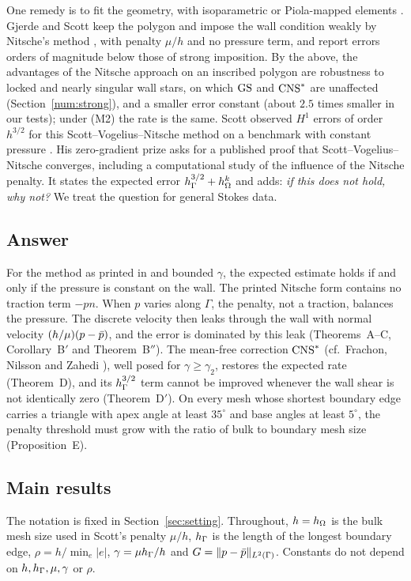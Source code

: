 One remedy is to fit the geometry, with isoparametric or Piola-mapped elements \cite{NeilanOtus2021,DurstNeilan2024}. Gjerde and Scott \cite{GjerdeScott2024} keep the polygon and impose the wall condition weakly by Nitsche's method \cite{Nitsche1971}, with penalty $\mu/h$ and no pressure term, and report errors orders of magnitude below those of strong imposition. By the above, the advantages of the Nitsche approach on an inscribed polygon are robustness to locked and nearly singular wall stars, on which $\mathrm{GS}$ and $\mathrm{CNS}^\ast$ are unaffected (Section~\ref{num:strong}), and a smaller error constant (about $2.5$ times smaller in our tests); under (M2) the rate is the same. Scott observed $H^1$ errors of order $h^{3/2}$ for this Scott--Vogelius--Nitsche method on a benchmark with constant pressure \cite{ScottPrize}. His zero-gradient prize \cite{ScottPrize} asks for a published proof that Scott--Vogelius--Nitsche converges, including a computational study of the influence of the Nitsche penalty. It states the expected error $h_\Gamma^{3/2}+h_\Omega^k$ and adds: \emph{if this does not hold, why not?} We treat the question for general Stokes data.

\subsection*{Answer}
For the method as printed in \cite[(27)--(28)]{GjerdeScott2024} and bounded $\gamma$, the expected estimate holds if and only if the pressure is constant on the wall. The printed Nitsche form contains no traction term $-pn$. When $p$ varies along $\Gamma$, the penalty, not a traction, balances the pressure. The discrete velocity then leaks through the wall with normal velocity $(h/\mu)(p-\bar p)$, and the error is dominated by this leak (Theorems~A--C, Corollary~B$'$ and Theorem~B$''$). The mean-free correction $\mathrm{CNS}^\ast$ (cf.\ Frachon, Nilsson and Zahedi \cite{FrachonNilssonZahedi2024}), well posed for $\gamma\ge\gamma_2$, restores the expected rate (Theorem~D), and its $h_\Gamma^{3/2}$ term cannot be improved whenever the wall shear is not identically zero (Theorem~D$'$). On every mesh whose shortest boundary edge carries a triangle with apex angle at least $35^\circ$ and base angles at least $5^\circ$, the penalty threshold must grow with the ratio of bulk to boundary mesh size (Proposition~E).

\subsection*{Main results}
The notation is fixed in Section~\ref{sec:setting}. Throughout, $h=h_\Omega$ is the bulk mesh size used in Scott's penalty $\mu/h$, $h_\Gamma$ is the length of the longest boundary edge, $\rho=h/\min_e|e|$, $\gamma=\mu h_\Gamma/h$ and $G=\lVert p-\bar p\rVert_{L^2(\Gamma)}$. Constants do not depend on $h,h_\Gamma,\mu,\gamma$ or $\rho$.

